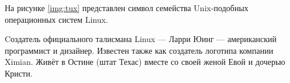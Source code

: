 \documentclass{bmstu}
\begin{document}
	

На рисунке \ref{img:tux} представлен символ семейства Unix-подобных операционных систем Linux.

Cоздатель официального талисмана Linux --- Ларри Юинг --- американский программист и дизайнер.
Известен также как создатель логотипа компании Ximian.
Живёт в Остине (штат Техас) вместе со своей женой Евой и дочерью Кристи.
\end{document}
